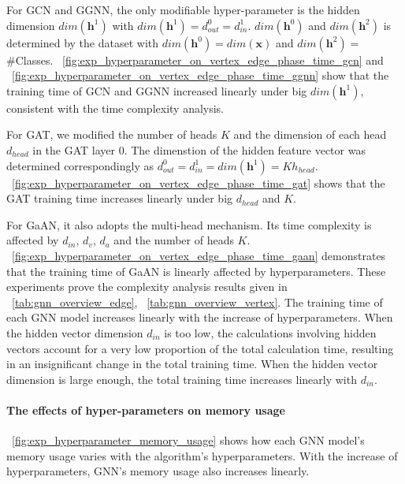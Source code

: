 For GCN and GGNN, the only modifiable hyper-parameter is the hidden dimension $dim(\boldsymbol{h}^1)$ with $dim(\boldsymbol{h}^1) = d^0_{out} = d^1_{in}$.
$dim(\boldsymbol{h}^0)$ and $dim(\boldsymbol{h}^2)$ is determined by the dataset with $dim(\boldsymbol{h}^0)=dim(\boldsymbol{x})$ and $dim(\boldsymbol{h}^2)=$\#Classes.
\figurename~\ref{fig:exp_hyperparameter_on_vertex_edge_phase_time_gcn} and \figurename~\ref{fig:exp_hyperparameter_on_vertex_edge_phase_time_ggnn} show that the training time of GCN and GGNN increased linearly under big $dim(\boldsymbol{h}^1)$, consistent with the time complexity analysis.

For GAT, we modified the number of heads $K$ and the dimension of each head $d_{head}$ in the GAT layer 0.
The dimenstion of the hidden feature vector was determined correspondingly as $d^0_{out} = d^1_{in} = dim(\boldsymbol{h}^1) = K h_{head}$.
\figurename~\ref{fig:exp_hyperparameter_on_vertex_edge_phase_time_gat} shows that the GAT training time increases linearly under big $d_{head}$ and $K$.

For GaAN, it also adopts the multi-head mechanism.
Its time complexity is affected by $d_{in}$, $d_v$, $d_a$ and the number of heads $K$.
\figurename~\ref{fig:exp_hyperparameter_on_vertex_edge_phase_time_gaan} demonstrates that the training time of GaAN is linearly affected by hyperparameters.
These experiments prove the complexity analysis results given in \tablename~\ref{tab:gnn_overview_edge}, \tablename~\ref{tab:gnn_overview_vertex}.
The training time of each GNN model increases linearly with the increase of hyperparameters.
When the hidden vector dimension $d_{in}$ is too low, the calculations involving hidden vectors account for a very low proportion of the total calculation time,
resulting in an insignificant change in the total training time.
When the hidden vector dimension is large enough, the total training time increases linearly with $d_{in}$.


\paragraph{The effects of hyper-parameters on memory usage}
\figurename~\ref{fig:exp_hyperparameter_memory_usage} shows how each GNN model's memory usage varies with the algorithm's hyperparameters.
With the increase of hyperparameters, GNN's memory usage also increases linearly.

